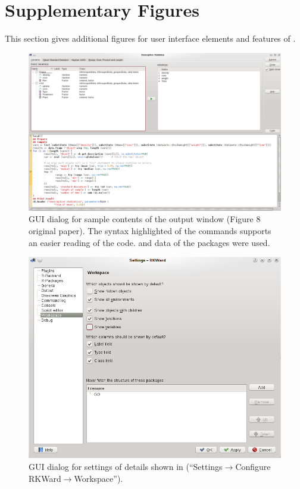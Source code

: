 \section{Supplementary Figures}
\label{sec:Supplementary_figures}
This section gives additional figures for user interface elements and features of .

\begin{figure}[!h]
 \centering
 \includegraphics[width=15.4cm]{./figures/figure8_supplement.png}
 \caption{GUI dialog for sample contents of the output window (Figure 8 original paper). The syntax highlighted of the commands supports an easier reading of the code.
  and  data of the  packages were used.}
 \label{fig:figure8_supplement}
\end{figure}

\begin{figure}[!h]
 \centering
 \includegraphics[width=15.4cm]{./figures/settings.png}
 \caption{GUI dialog for settings of details shown in  (``Settings$\rightarrow$Configure RKWard$\rightarrow$Workspace'').}
 \label{fig:settings}
\end{figure}